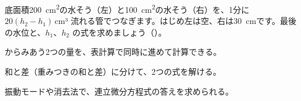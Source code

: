 \bkproblem 底面積\qty{200}{cm^2}の水そう（左）と\qty{100}{cm^2}の水そう（右）を、1分に $20(h_2-h_1)$\,cm³ 流れる管でつなぎます。はじめ左は空、右は\qty{30}{cm}です。最後の水位と、$h_1$、$h_2$ の式を求めましょう\mbox{（）}。

\begin{furikaeri}
\begin{checklist}
\item からみあう2つの量を、表計算で同時に進めて計算できる。
\item 和と差（重みつきの和と差）に分けて、2つの式を解ける。
\item 振動モードや消去法で、連立微分方程式の答えを求められる。
\end{checklist}
\end{furikaeri}

